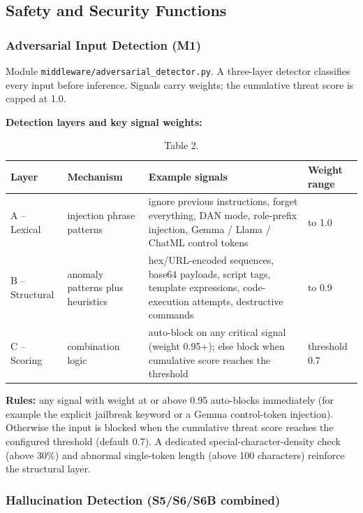 \documentclass[10pt,journal,onecolumn]{IEEEtran}
\begin{document}
\subsection{Safety and Security Functions}

\subsubsection{Adversarial Input Detection (M1)}

Module \texttt{middleware/\allowbreak adversarial\_\allowbreak detector.\allowbreak py}. A three-layer detector classifies every input before inference. Signals carry weights; the cumulative threat score is capped at 1.0.

\textbf{Detection layers and key signal weights:}

\begin{table}[h]
\caption{Table 2.}
\label{tab:t2}
\begin{tabularx}{\columnwidth}{l >{\raggedright\arraybackslash}X >{\raggedright\arraybackslash}X >{\raggedright\arraybackslash}X}
\toprule
\textbf{Layer} & \textbf{Mechanism} & \textbf{Example signals} & \textbf{Weight range}\\
\midrule
A -- Lexical & 15 injection phrase patterns & ignore previous instructions, forget everything, DAN mode, role-prefix injection, Gemma / Llama / ChatML control tokens & 0.8 to 1.0\\
B -- Structural & anomaly patterns plus heuristics & hex/URL-encoded sequences, base64 payloads, script tags, template expressions, code-execution attempts, destructive commands & 0.3 to 0.9\\
C -- Scoring & combination logic & auto-block on any critical signal (weight 0.95+); else block when cumulative score reaches the threshold & threshold 0.7\\
\bottomrule
\end{tabularx}
\end{table}

\textbf{Rules:} any signal with weight at or above 0.95 auto-blocks immediately (for example the explicit jailbreak keyword or a Gemma control-token injection). Otherwise the input is blocked when the cumulative threat score reaches the configured threshold (default 0.7). A dedicated special-character-density check (above 30\%) and abnormal single-token length (above 100 characters) reinforce the structural layer.

\subsubsection{Hallucination Detection (S5/S6/S6B combined)}
\end{document}

